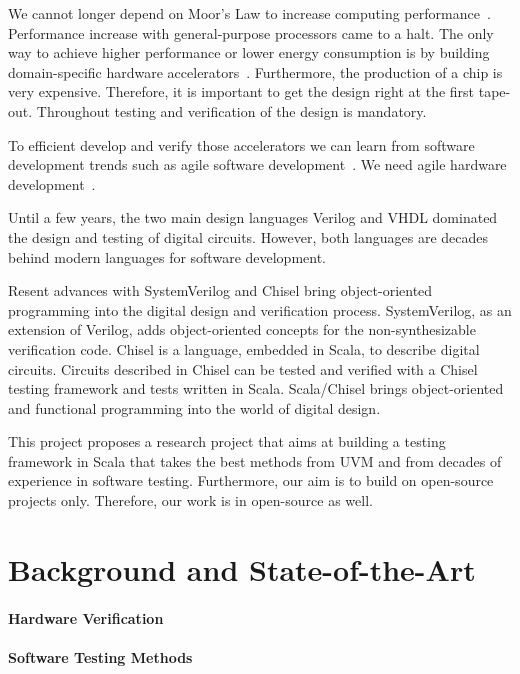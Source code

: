 \documentclass[fleqn,12pt]{article}
\begin{document}
We cannot longer depend on Moor's Law to increase computing performance~\cite{dark-silicon:2011}.
Performance increase with general-purpose processors came to a halt.
The only way to achieve higher performance or lower energy consumption
is by building domain-specific hardware accelerators~\cite{domain-hw-acc:2020}.
Furthermore, the production of a chip is very expensive. Therefore, it is important to get the design right
at the first tape-out. Throughout testing and verification of the design is mandatory.

To efficient develop and verify those accelerators we can learn from software development trends
such as agile software development~\cite{agile:manifesto}.
We need agile hardware development~\cite{henn-patt:turing:2019}.

Until a few years, the two main design languages Verilog and VHDL dominated the
design and testing of digital circuits. However, both languages are decades behind
modern languages for software development.

Resent advances with SystemVerilog and Chisel bring object-oriented programming
into the digital design and verification process. SystemVerilog, as an extension of Verilog,
adds object-oriented concepts for the non-synthesizable verification code.
Chisel is a language, embedded in Scala, to describe digital circuits.
Circuits described in Chisel can be tested and verified with a Chisel testing
framework and tests written in Scala.
Scala/Chisel brings object-oriented and functional programming into the world of
digital design.

This project proposes a research project that aims at building a testing framework
in Scala that takes the best methods from UVM and from decades of experience
in software testing.
Furthermore, our aim is to build on open-source projects only. Therefore, our
work is in open-source as well.


\section{Background and State-of-the-Art}
\label{sec:background}


\paragraph{Hardware Verification}




\paragraph{Software Testing Methods}
\end{document}
